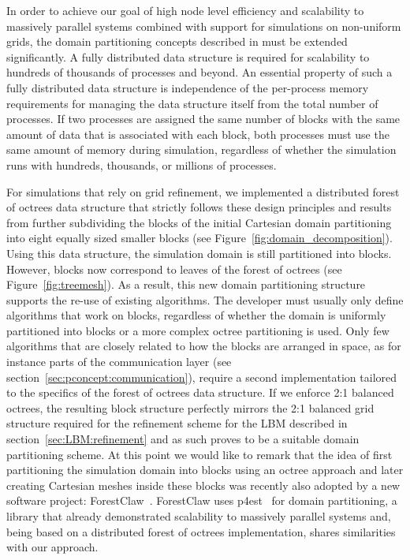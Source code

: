 \documentclass[final,leqno,onefignum,onetabnum]{siamltex1213}
\begin{document}
In order to achieve our goal of high node level efficiency and scalability to massively parallel systems combined with support for simulations on non-uniform grids,
the domain partitioning concepts described in \cite{Feichtinger2011105} must be extended significantly.
A fully distributed data structure is required for scalability to hundreds of thousands of processes and beyond.
An essential property of such a fully distributed data structure is independence of the per-process memory requirements for managing the data structure itself from the total number of processes.
If two processes are assigned the same number of blocks with the same amount of data that is associated with each block,
both processes must use the same amount of memory during simulation, regardless of whether the simulation runs with hundreds, thousands, or millions of processes.

For simulations that rely on grid refinement, we implemented a distributed forest of octrees data structure that
strictly follows these design principles
and results from further subdividing the blocks of the initial Cartesian domain partitioning into eight equally sized smaller blocks (see Figure~\ref{fig:domain_decomposition}).
Using this data structure, the simulation domain is still partitioned into blocks.
However, blocks now correspond to leaves of the forest of octrees (see Figure~\ref{fig:treemesh}).
As a result, this new domain partitioning structure supports the re-use of existing algorithms.
The developer must usually only define algorithms that work on blocks,
regardless of whether the domain is uniformly partitioned into blocks or a more complex octree partitioning is used.
Only few algorithms that are closely related to how the blocks are arranged in space, as for instance parts of the communication layer (see section~\ref{sec:pconcept:communication}),
require a second implementation tailored to the specifics of the forest of octrees data structure.
If we enforce 2:1 balanced octrees,
the resulting block structure perfectly mirrors the 2:1 balanced grid structure required for the refinement scheme for the LBM described in section~\ref{sec:LBM:refinement}
and as such proves to be a suitable domain partitioning scheme.
At this point we would like to remark that the idea of first partitioning the simulation domain into blocks using an octree approach
and later creating Cartesian meshes inside these blocks
was recently also adopted by a new software project: ForestClaw~\cite{Burstedde2014}.
ForestClaw uses p4est~\cite{Burstedde2011} for domain partitioning, a library that already demonstrated scalability to massively parallel systems
and, being based on a distributed forest of octrees implementation, shares similarities with our approach.
\end{document}
